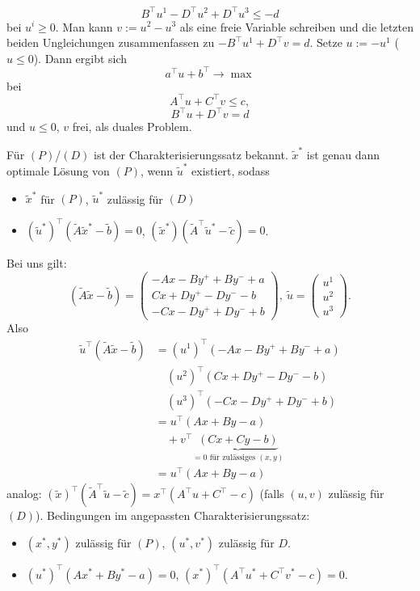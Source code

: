 \begin{solution}
\begin{tasks}
$$    B^\top u^1-D^\top u^2+D^\top u^3\leq -d
    $$
    bei $u^i\geq 0$. Man kann $v:=u^2-u^3$ als eine freie Variable schreiben und die letzten beiden Ungleichungen zusammenfassen zu $-B^\top u^1+D^\top v=d$.
    Setze $u:=-u^1$ ($u\leq 0$). Dann ergibt sich
    $$
    a^\top u+b^\top\to\max
    $$
    bei
    $$
    A^\top u+C^\top v\leq c,
    $$
    $$
    B^\top u+ D^\top v=d
    $$
    und $u\leq 0$, $v$ frei, als duales Problem.
        \item Für $(P)$/$(D)$ ist der Charakterisierungssatz bekannt. $\tilde x^\ast$ ist genau dann optimale Lösung von $(P)$, wenn $\tilde u^\ast$ existiert, sodass
    \begin{itemize}
            \item $\tilde x^\ast$ für $(P)$, $\tilde u^\ast$ zulässig für $(D)$
        \item $(\tilde u^\ast)^\top(\tilde A\tilde x^\ast-\tilde b)=0$, $(\tilde x^\ast)(\tilde A^\top \tilde u^\ast-\tilde c)=0$.
\end{itemize}
Bei uns gilt:
$$
(\tilde A\tilde x-\tilde b)=
\begin{pmatrix}
    -Ax-By^++By^-+a\\
    Cx+Dy^+-Dy^--b\\
    -Cx-Dy^++Dy^-+b
\end{pmatrix},\
\tilde u =
\begin{pmatrix}
    u^1\\
    u^2\\
    u^3
\end{pmatrix}.
$$
Also
\begin{align*}
    \tilde u^\top(\tilde A\tilde x-\tilde b)& = {(u^1)}^\top(-Ax-By^++By^-+a)\\
    & \quad {(u^2)}^\top(Cx+Dy^+-Dy^--b)\\
    & \quad {(u^3)}^\top(-Cx-Dy^++Dy^-+b)\\
    & = u^\top(Ax+By-a)\\
    & \quad +v^\top\underbrace{(Cx+Cy-b)}_{=0\text{ für zulässiges $(x,y)$}}\\
    & = u^\top(Ax+By-a)
\end{align*}
analog: ${(\tilde x)}^\top(\tilde A^\top\tilde u-\tilde c)=x^\top(A^\top u+C^\top-c)$ (falls $(u,v)$ zulässig für $(D)$).
Bedingungen im angepassten Charakterisierungssatz:
\begin{itemize}
        \item $(x^\ast,y^\ast)$ zulässig für $(P)$, $(u^\ast,v^\ast)$ zulässig für $D$.
    \item ${(u^\ast)}^\top(Ax^\ast+By^\ast-a)=0$, ${(x^\ast)}^\top(A^\top u^\ast+C^\top v^\ast-c)=0$.
\end{itemize}
\end{tasks}
\end{solution}
